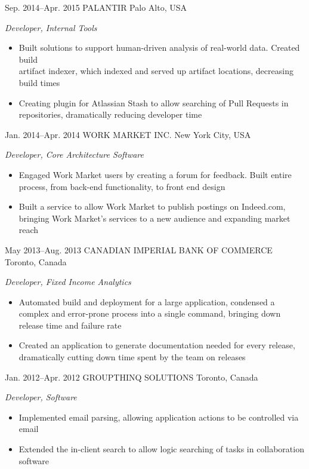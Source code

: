 \documentclass[]{friggeri-cv} %
\begin{document}
\begin{sectionlist}
	\entry
	{Sep. 2014--Apr. 2015}
	{PALANTIR}
	{Palo Alto, USA}
	{\emph{Developer, Internal Tools} \\
		\begin{itemize}
			\item Built solutions to support human-driven analysis of real-world data. Created build \\artifact indexer, which indexed and served up artifact locations, decreasing build times
			\item Creating plugin for Atlassian Stash to allow searching of Pull Requests in repositories, dramatically reducing developer time
		\end{itemize}
	}
	
	\entry
	{Jan. 2014--Apr. 2014}
	{WORK MARKET INC.}
	{New York City, USA}
	{\emph{Developer, Core Architecture Software} \\
		\begin{itemize}
			\item Engaged Work Market users by creating a forum for feedback. Built entire process, from back-end functionality, to front end design
			\item Built a service to allow Work Market to publish postings on Indeed.com, bringing Work Market's services to a new audience and expanding market reach
		\end{itemize}
	}
	
	\entry
	{May 2013--Aug. 2013}
	{CANADIAN IMPERIAL BANK OF COMMERCE}
	{Toronto, Canada}
	{\emph{Developer, Fixed Income Analytics} \\
		\begin{itemize}
			\item Automated build and deployment for a large application, condensed a complex and error-prone process into a single command, bringing down release time and failure rate
			\item Created an application to generate documentation needed for every release,\\dramatically cutting down time spent by the team on releases
		\end{itemize}
	}
		
	\entry
	{Jan. 2012--Apr. 2012}
	{GROUPTHINQ SOLUTIONS}
	{Toronto, Canada}
	{\emph{Developer, Software} \\
		\begin{itemize}
			\item Implemented email parsing, allowing application actions to be controlled via email	
			\item Extended the in-client search to allow logic searching of tasks in collaboration software 
		\end{itemize}
	}
\end{sectionlist}
\end{document}
